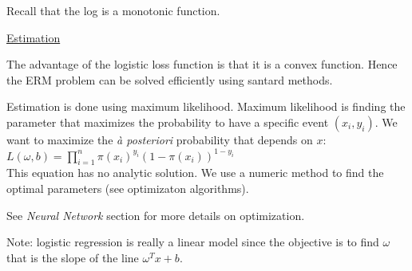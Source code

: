 Recall that the log is a monotonic function.

\vspace{5mm}

\underline{Estimation}

The advantage of the logistic loss function is that it is a convex function. Hence the ERM problem can be solved efficiently using santard methods.

Estimation is done using maximum likelihood. Maximum likelihood is finding the parameter that maximizes the probability to have a specific event $(x_i, y_i)$. We want to maximize the \textit{à posteriori} probability that depends on $x$: \\

$L(\omega, b) = \prod_{i=1}^n \pi(x_i)^{y_i}(1-\pi(x_i))^{1-y_i}$ \\

This equation has no analytic solution. We use a numeric method to find the optimal parameters (see optimizaton algorithms).

See \textit{Neural Network} section for more details on optimization.

\vspace{5mm}

Note: logistic regression is really a linear model since the objective is to find $\omega$ that is the slope of the line $\omega ^Tx + b$.

\vspace{5mm}
